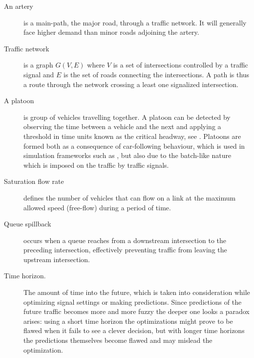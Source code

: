 \begin{description}
\item[An artery] is a main-path, the major road, through a traffic network. It will generally face higher demand than minor roads adjoining the artery.

\item[Traffic network] is a graph $G(V,E)$ where $V$ is a set of intersections controlled by a traffic signal and $E$ is the set of roads connecting the intersections. A path is thus a route through the network crossing a least one signalized intersection.

	\item[A platoon] is group of vehicles travelling together. A platoon can be detected by observing the time between a vehicle and the next and applying a threshold in time units known as the critical headway, see \cite[sct. 2]{25}. 
Platoons are formed both as a consequence of car-following behaviour, which is used in simulation frameworks such as \cite{treiber-2000-62}, but also due to the batch-like nature which is imposed on the traffic by traffic signals.

\item[Saturation flow rate] defines the number of vehicles that can flow on a link at the maximum allowed speed (free-flow) during a period of time.

\item[Queue spillback] occurs when a queue reaches from a downstream intersection to the preceding intersection, effectively preventing traffic from leaving the upstream intersection.

\item[Time horizon.] The amount of time into the future, which is taken into consideration while optimizing signal settings or making predictions. Since predictions of the future traffic becomes more and more fuzzy the deeper one looks a paradox arises: using a short time horizon the optimizations might prove to be flawed when it fails to see a clever decision, but with longer time horizons the predictions themselves become flawed and may mislead the optimization.

\end{description}
